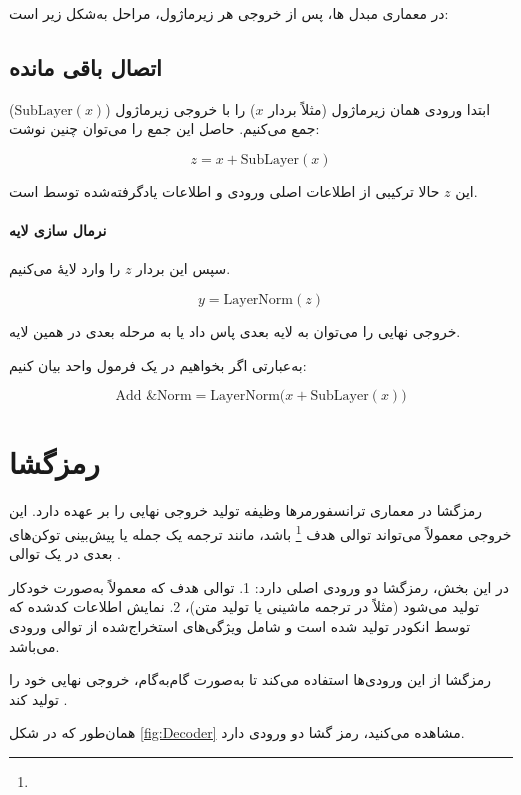 در معماری مبدل ها، پس از خروجی هر زیرماژول، مراحل به‌شکل زیر است:

\subsection{اتصال باقی مانده}
ابتدا ورودی همان زیرماژول (مثلاً بردار \( x \)) را با خروجی زیرماژول (\( \text{SubLayer}(x) \)) جمع می‌کنیم. حاصل این جمع را می‌توان چنین نوشت:


\begin{equation}
	z = x + \text{SubLayer}(x)
\end{equation}


این \( z \) حالا ترکیبی از اطلاعات اصلی ورودی و اطلاعات یادگرفته‌شده توسط  است.

\paragraph{نرمال سازی لایه}
سپس این بردار \( z \) را وارد لایهٔ  می‌کنیم.

\[
y = \text{LayerNorm}(z)
\]

خروجی نهایی را می‌توان به لایه بعدی پاس داد یا به مرحله بعدی در همین لایه.

به‌عبارتی اگر بخواهیم در یک فرمول واحد بیان کنیم:

\[
\text{Add \& Norm} = \text{LayerNorm}\bigl(x + \text{SubLayer}(x)\bigr)
\]


\section{رمزگشا}
رمزگشا در معماری ترانسفورمرها وظیفه تولید خروجی نهایی را بر عهده دارد. این خروجی معمولاً می‌تواند توالی هدف \footnote{} باشد، مانند ترجمه یک جمله یا پیش‌بینی توکن‌های بعدی در یک توالی \cite{vaswani2017attention}. 

در این بخش، رمزگشا دو ورودی اصلی دارد:  
1. توالی هدف که معمولاً به‌صورت خودکار تولید می‌شود (مثلاً در ترجمه ماشینی یا تولید متن)،  
2. نمایش اطلاعات کدشده که توسط انکودر تولید شده است و شامل ویژگی‌های استخراج‌شده از توالی ورودی می‌باشد.  

رمزگشا از این ورودی‌ها استفاده می‌کند تا به‌صورت گام‌به‌گام، خروجی نهایی خود را تولید کند \cite{bahdanau2014neural,sutskever2014sequence}.

همان‌طور که در شکل \ref{fig:Decoder} مشاهده می‌کنید،  رمز گشا دو ورودی دارد.

